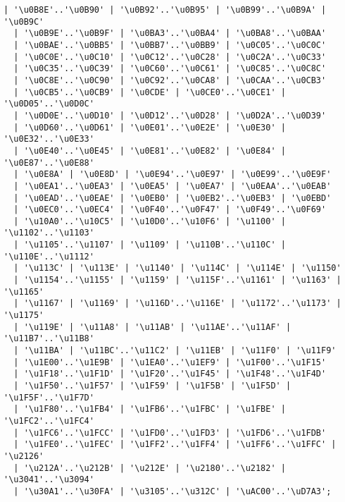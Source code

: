 \begin{Verbatim}[frame=none, fontsize=\footnotesize]
  | '\u0B8E'..'\u0B90' | '\u0B92'..'\u0B95' | '\u0B99'..'\u0B9A' | '\u0B9C' 
  | '\u0B9E'..'\u0B9F' | '\u0BA3'..'\u0BA4' | '\u0BA8'..'\u0BAA' 
  | '\u0BAE'..'\u0BB5' | '\u0BB7'..'\u0BB9' | '\u0C05'..'\u0C0C' 
  | '\u0C0E'..'\u0C10' | '\u0C12'..'\u0C28' | '\u0C2A'..'\u0C33' 
  | '\u0C35'..'\u0C39' | '\u0C60'..'\u0C61' | '\u0C85'..'\u0C8C' 
  | '\u0C8E'..'\u0C90' | '\u0C92'..'\u0CA8' | '\u0CAA'..'\u0CB3' 
  | '\u0CB5'..'\u0CB9' | '\u0CDE' | '\u0CE0'..'\u0CE1' | '\u0D05'..'\u0D0C' 
  | '\u0D0E'..'\u0D10' | '\u0D12'..'\u0D28' | '\u0D2A'..'\u0D39' 
  | '\u0D60'..'\u0D61' | '\u0E01'..'\u0E2E' | '\u0E30' | '\u0E32'..'\u0E33' 
  | '\u0E40'..'\u0E45' | '\u0E81'..'\u0E82' | '\u0E84' | '\u0E87'..'\u0E88' 
  | '\u0E8A' | '\u0E8D' | '\u0E94'..'\u0E97' | '\u0E99'..'\u0E9F' 
  | '\u0EA1'..'\u0EA3' | '\u0EA5' | '\u0EA7' | '\u0EAA'..'\u0EAB' 
  | '\u0EAD'..'\u0EAE' | '\u0EB0' | '\u0EB2'..'\u0EB3' | '\u0EBD' 
  | '\u0EC0'..'\u0EC4' | '\u0F40'..'\u0F47' | '\u0F49'..'\u0F69' 
  | '\u10A0'..'\u10C5' | '\u10D0'..'\u10F6' | '\u1100' | '\u1102'..'\u1103' 
  | '\u1105'..'\u1107' | '\u1109' | '\u110B'..'\u110C' | '\u110E'..'\u1112' 
  | '\u113C' | '\u113E' | '\u1140' | '\u114C' | '\u114E' | '\u1150' 
  | '\u1154'..'\u1155' | '\u1159' | '\u115F'..'\u1161' | '\u1163' | '\u1165' 
  | '\u1167' | '\u1169' | '\u116D'..'\u116E' | '\u1172'..'\u1173' | '\u1175' 
  | '\u119E' | '\u11A8' | '\u11AB' | '\u11AE'..'\u11AF' | '\u11B7'..'\u11B8' 
  | '\u11BA' | '\u11BC'..'\u11C2' | '\u11EB' | '\u11F0' | '\u11F9' 
  | '\u1E00'..'\u1E9B' | '\u1EA0'..'\u1EF9' | '\u1F00'..'\u1F15' 
  | '\u1F18'..'\u1F1D' | '\u1F20'..'\u1F45' | '\u1F48'..'\u1F4D' 
  | '\u1F50'..'\u1F57' | '\u1F59' | '\u1F5B' | '\u1F5D' | '\u1F5F'..'\u1F7D' 
  | '\u1F80'..'\u1FB4' | '\u1FB6'..'\u1FBC' | '\u1FBE' | '\u1FC2'..'\u1FC4' 
  | '\u1FC6'..'\u1FCC' | '\u1FD0'..'\u1FD3' | '\u1FD6'..'\u1FDB' 
  | '\u1FE0'..'\u1FEC' | '\u1FF2'..'\u1FF4' | '\u1FF6'..'\u1FFC' | '\u2126' 
  | '\u212A'..'\u212B' | '\u212E' | '\u2180'..'\u2182' | '\u3041'..'\u3094' 
  | '\u30A1'..'\u30FA' | '\u3105'..'\u312C' | '\uAC00'..'\uD7A3';


\end{Verbatim}
